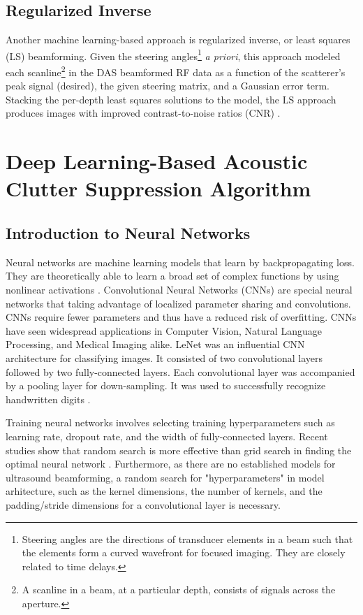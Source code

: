     \subsection{Regularized Inverse}
      Another machine learning-based approach is regularized inverse, or least squares (LS) beamforming. Given the steering angles\footnote{Steering angles are the directions of transducer elements in a beam such that the elements form a curved wavefront for focused imaging. They are closely related to time delays.} \textit{a priori}, this approach modeled each scanline\footnote{A scanline in a beam, at a particular depth, consists of signals across the aperture.} in the DAS beamformed RF data as a function of the scatterer's peak signal (desired), the given steering matrix, and a Gaussian error term. Stacking the per-depth least squares solutions to the model, the LS approach produces images with improved contrast-to-noise ratios (CNR) \cite{szasz_regularized_inverse}. %

  \section{Deep Learning-Based Acoustic Clutter Suppression Algorithm} %
    \subsection{Introduction to Neural Networks}
      Neural networks are machine learning models that learn by backpropagating loss. They are theoretically able to learn a broad set of complex functions by using nonlinear activations \cite{rumelhart1985learning}. Convolutional Neural Networks (CNNs) are special neural networks that taking advantage of localized parameter sharing and convolutions. CNNs require fewer parameters and thus have a reduced risk of overfitting. CNNs have seen widespread applications in Computer Vision, Natural Language Processing, and Medical Imaging alike. LeNet was an influential CNN architecture for classifying images. It consisted of two convolutional layers followed by two fully-connected layers. Each convolutional layer was accompanied by a pooling layer for down-sampling. It was used to successfully recognize handwritten digits \cite{lenet}.

      Training neural networks involves selecting training hyperparameters such as learning rate, dropout rate, and the width of fully-connected layers. Recent studies show that random search is more effective than grid search in finding the optimal neural network \cite{bergstra2012random}. Furthermore, as there are no established models for ultrasound beamforming, a random search for "hyperparameters" in model arhitecture, such as the kernel dimensions, the number of kernels, and the padding/stride dimensions for a convolutional layer is necessary.

